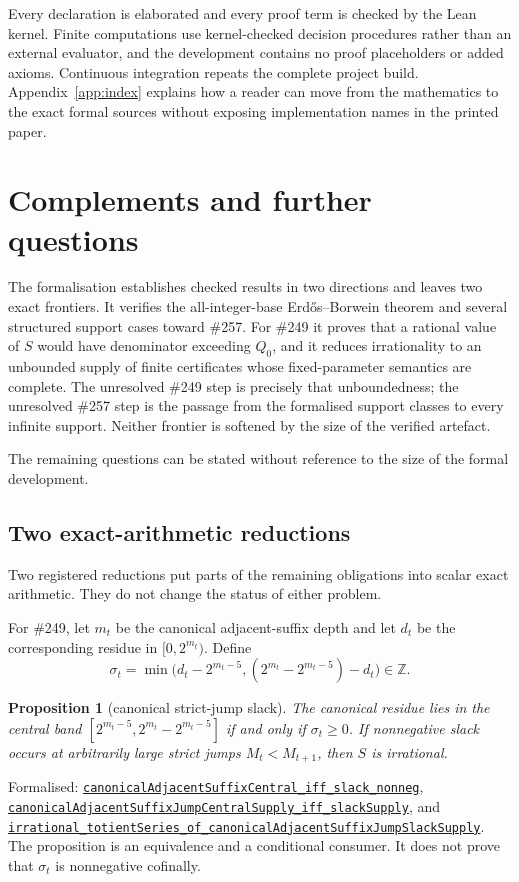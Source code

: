 \documentclass[11pt]{article}
\newcommand{\commit}{81150c1c6fdd4cd51e76d3aa0de344341e0e9e7c}
\newcommand{\repobase}{https://github.com/wcook04/plectis-lean-erdos249-257/blob/\commit}
\newcommand{\PK}{Erdos249257}
\newcommand{\lref}[3]{\href{\repobase/\PK/#1\#L#2}{\nolinkurl{#3}}}
\newcommand{\lrefx}[3]{\href{\repobase/\PK/#1\#L#2}{\nolinkurl{#3}}}
\newtheorem{proposition}[theorem]{Proposition}
\theoremstyle{definition}
\theoremstyle{remark}
\newcommand{\Z}{\mathbb{Z}}
\newcommand{\Qzero}{Q_0}
\begin{document}
Every declaration is elaborated and every proof term is checked by the Lean
kernel. Finite computations use kernel-checked decision procedures rather than
an external evaluator, and the development contains no proof placeholders or
added axioms. Continuous integration repeats the complete project build.
Appendix~\ref{app:index} explains how a reader can move from the mathematics
to the exact formal sources without exposing implementation names in the
printed paper.

\section{Complements and further questions}\label{sec:further}

The formalisation establishes checked results in two directions and leaves two
exact frontiers. It
verifies the all-integer-base Erd\H{o}s--Borwein theorem and several structured
support cases toward \#257. For \#249 it proves that a rational value of $S$
would have denominator exceeding $\Qzero$, and it reduces irrationality to an
unbounded supply of finite certificates whose fixed-parameter semantics are
complete. The unresolved \#249 step is precisely that unboundedness; the
unresolved \#257 step is the passage from the formalised support classes to
every infinite support. Neither frontier is softened by the size of the
verified artefact.

The remaining questions can be stated without reference to the size of the
formal development.

\subsection{Two exact-arithmetic reductions}

Two registered reductions put parts of the remaining obligations into scalar
exact arithmetic.  They do not change the status of either problem.

For \#249, let $m_t$ be the canonical adjacent-suffix depth and let $d_t$ be
the corresponding residue in $[0,2^{m_t})$.  Define
\[
  \sigma_t=\min\bigl(d_t-2^{m_t-5},
    (2^{m_t}-2^{m_t-5})-d_t\bigr)\in\Z.
\]

\begin{proposition}[canonical strict-jump slack]\label{res:slackfrontier}
The canonical residue lies in the central band
$[2^{m_t-5},2^{m_t}-2^{m_t-5}]$ if and only if $\sigma_t\ge0$.
If nonnegative slack occurs at arbitrarily large strict jumps
$M_t<M_{t+1}$, then $S$ is irrational.
\end{proposition}
\noindent Formalised:
\lrefx{DiagonalFreshLossBridge.lean}{2469}{canonicalAdjacentSuffixCentral_iff_slack_nonneg},
\lrefx{DiagonalFreshLossBridge.lean}{2559}{canonicalAdjacentSuffixJumpCentralSupply_iff_slackSupply},
and
\lref{DiagonalFreshLossBridge.lean}{2731}{irrational_totientSeries_of_canonicalAdjacentSuffixJumpSlackSupply}.
The proposition is an equivalence and a conditional consumer.  It does not
prove that $\sigma_t$ is nonnegative cofinally.
\end{document}
